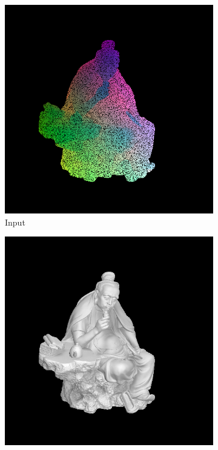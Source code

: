 \begin{figure}[th]
	
	\begin{subfigure}[b]{0.32\linewidth}
		\includegraphics[width=\linewidth]{./Figures/comparison_512/fancy_eval_11_point_cloud_noise.png}
		\caption{Input}
	\end{subfigure}
	\begin{subfigure}[b]{0.32\linewidth}
		\includegraphics[width=\linewidth]{./Figures/comparison_512/fancy_eval_11_img.png}

\end{subfigure}
\end{figure}

